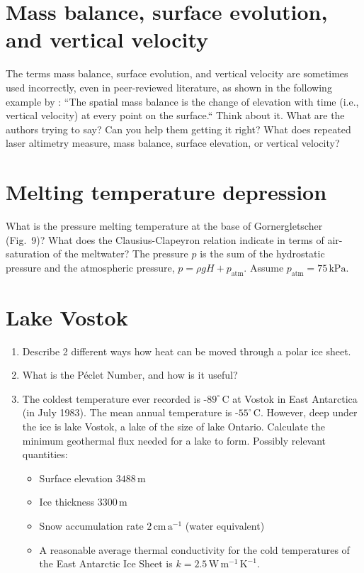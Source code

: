 \documentclass[parskip=half]{scrartcl}
\newcommand{\cels}[1]{\ensuremath{#1^{\circ}\,\mathrm{C}}}
\begin{document}
\section{Mass balance, surface evolution, and vertical velocity}

The terms mass balance, surface evolution, and vertical velocity are sometimes used incorrectly, even in peer-reviewed literature, as shown in the following example by \cite{Konrad1999}: ``The spatial mass balance is the change of elevation with time (i.e., vertical velocity) at every point on the surface.`` Think about it. What are the authors trying to say? Can you help them getting it right? What does repeated laser altimetry measure, mass balance, surface elevation, or vertical velocity?


\section{Melting temperature depression}

What is the pressure melting temperature at the base of Gornergletscher (Fig.~9)? What does the Clausius-Clapeyron relation indicate in terms of air-saturation of the meltwater? The pressure $p$ is the sum of the hydrostatic pressure and the atmospheric pressure, $p = \rho g H + p_{\text{atm}}$. Assume $p_{\text{atm}} = 75\,\text{kPa}$.

\section{Lake Vostok}

\begin{enumerate}
\item Describe 2 different ways how heat can be moved through a polar ice sheet.
\item What is the P\'eclet Number, and how is it useful?
\item The coldest temperature ever recorded is -\cels{89} at Vostok in East Antarctica (in July 1983). The mean annual temperature is -\cels{55}. However, deep under the ice is lake Vostok, a lake of the size of lake Ontario. Calculate the minimum geothermal flux needed for a lake to form. Possibly relevant quantities:
  \begin{itemize}
  \item Surface elevation $3488\,\text{m}$
  \item Ice thickness $3300\,\text{m}$
  \item Snow accumulation rate $2\,\text{cm}\,\text{a}^{-1}$ (water equivalent)
  \item A reasonable average thermal conductivity for the cold temperatures of the East Antarctic Ice Sheet is $k = 2.5\,\text{W}\,\text{m}^{−1}\,\text{K}^{−1}$.
  \end{itemize}
\end{enumerate}



\end{document}

